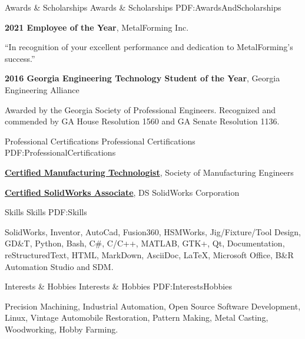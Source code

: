 \documentclass[
letterpaper,
MMMyyyy,
nonstopmode,
]{resume}
\begin{document}
\begin{Body}

\Section
{Awards \&\newline
Scholarships}
{Awards \& Scholarships}
{PDF:AwardsAndScholarships}

\textbf{2021 Employee of the Year},
MetalForming Inc.
\begin{Detail}
\SubBulletItem
“In recognition of your excellent performance and dedication to MetalForming’s success.”
\end{Detail}

\Gap

\textbf{2016 Georgia Engineering Technology Student of the Year},
Georgia Engineering Alliance
\begin{Detail}
\SubBulletItem
Awarded by the Georgia Society of Professional Engineers.
\SubBulletItem
Recognized and commended by GA House Resolution 1560 and GA Senate Resolution 1136.
\end{Detail}

\Gap


\Section
{Professional Certifications}
{Professional Certifications}
{PDF:ProfessionalCertifications}

\textbf{\href{http://www.sme.org/cmfgt/}
{Certified Manufacturing Technologist}},
Society of Manufacturing Engineers

\textbf{\href{http://www.solidworks.com/sw/support/mcad-certification-programs.htm}
{Certified SolidWorks Associate}},
DS SolidWorks Corporation



\Section
{Skills}
{Skills}
{PDF:Skills}

\Entry
SolidWorks, Inventor, AutoCad, Fusion360, HSMWorks,
Jig/Fixture/Tool Design, GD\&T,
Python, Bash, C\#, C/C++, MATLAB, GTK+, Qt,
Documentation, reStructuredText, HTML, MarkDown, AsciiDoc, \LaTeX,
Microsoft Office, B\&R Automation Studio and SDM.



\Section
{Interests \& Hobbies}
{Interests \& Hobbies}
{PDF:InterestsHobbies}

\Entry
Precision Machining,
Industrial Automation,
Open Source Software Development,
Linux,
Vintage Automobile Restoration,
Pattern Making, Metal Casting,
Woodworking, Hobby Farming.

\end{Body}
\end{document}
